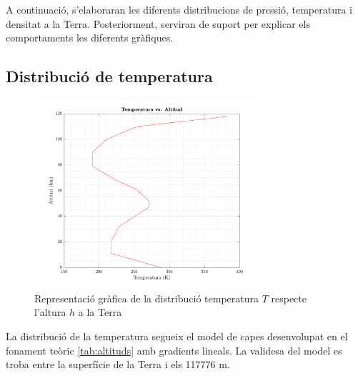 A continuació, s'elaboraran les diferents distribucions de pressió, temperatura i densitat a la Terra. Posteriorment, serviran de suport per explicar els comportaments les diferents gràfiques.

\subsection{Distribució de temperatura}
\begin{figure}[h]
    \centering
    \includegraphics[width=0.75\textwidth]{imagenes/03_grafiques_general/temperatura_earth.pdf}
    \caption{Representació gràfica de la distribució temperatura $T$ respecte l'altura $h$ a la Terra}
    \label{fig:temperatura_earth}
\end{figure}

La distribució de la temperatura segueix el model de capes desenvolupat en el fonament teòric \ref{tab:altituds} amb gradients lineals. La validesa del model es troba entre la superfície de la Terra i els 117776 m.

\newpage
